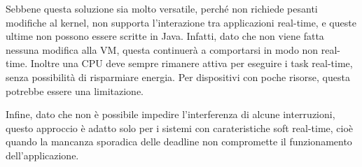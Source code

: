 Sebbene questa soluzione sia molto versatile, perché non richiede pesanti modifiche al kernel, non supporta l'interazione tra applicazioni real-time, e queste ultime non possono essere scritte in Java. Infatti, dato che non viene fatta nessuna modifica alla VM, questa continuerà a comportarsi in modo non real-time. Inoltre una CPU deve sempre rimanere attiva per eseguire i task real-time, senza possibilità di risparmiare energia. Per dispositivi con poche risorse, questa potrebbe essere una limitazione.

Infine, dato che non è possibile impedire l'interferenza di alcune interruzioni, questo approccio è adatto solo per i sistemi con carateristiche soft real-time, cioè quando la mancanza sporadica delle deadline non compromette il funzionamento dell'applicazione.